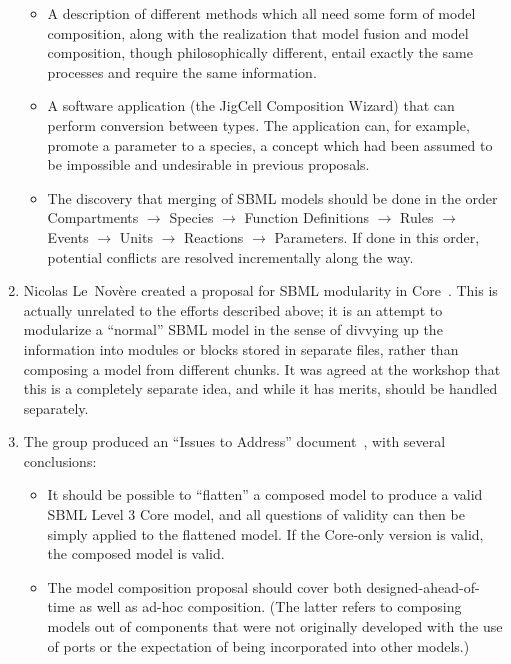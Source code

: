 \begin{enumerate}
\begin{itemize}
  \item A description of different methods which all need some form of model composition, along with the realization that model fusion and model composition, though philosophically different, entail exactly the same processes and require the same information.

  \item A software application (the JigCell Composition Wizard) that can perform conversion between types.  The application can, for example, promote a parameter to a species, a concept which had been assumed to be impossible and undesirable in previous proposals.  

  \item The discovery that merging of SBML models should be done in the order Compartments $\rightarrow$ Species  $\rightarrow$ Function Definitions  $\rightarrow$ Rules  $\rightarrow$ Events $\rightarrow$ Units  $\rightarrow$ Reactions  $\rightarrow$ Parameters.  If done in this order, potential conflicts are resolved incrementally along the way.

  \end{itemize}

\item Nicolas Le~Nov\`{e}re created a proposal for SBML modularity in Core~\citep{lenov:2007}.  This is actually unrelated to the efforts described above; it is an attempt to modularize a ``normal'' SBML model in the sense of divvying up the information into modules or blocks stored in separate files, rather than composing a model from different chunks.  It was agreed at the workshop that this is a completely separate idea, and while it has merits, should be handled separately.

\item The group produced an ``Issues to Address'' document~\citep{various:2007}, with several conclusions:

  \begin{itemize}

  \item It should be possible to ``flatten'' a composed model to produce a valid SBML Level 3 Core model, and all questions of validity can then be simply applied to the flattened model.  If the Core-only version is valid, the composed model is valid.

  \item The model composition proposal should cover both designed-ahead-of-time as well as ad-hoc composition. (The latter refers to composing models out of components that were not originally developed with the use of ports or the expectation of being incorporated into other models.)


\end{itemize}
\end{enumerate}
